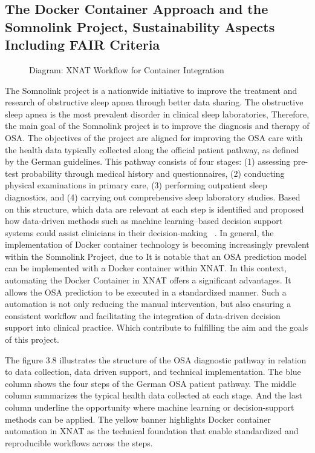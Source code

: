 \subsection{The Docker Container Approach and the Somnolink Project, Sustainability Aspects Including FAIR Criteria}
\begin{figure}[H]
    \centering
    \def\svgwidth{\linewidth} 
    
    \caption{Diagram: XNAT Workflow for Container Integration}
    \label{fig:workflowxnat}
\end{figure}

The Somnolink project is a nationwide initiative to improve the treatment and research of obstructive sleep apnea through better data sharing. The obstructive sleep apnea is the most prevalent disorder in clinical sleep laboratories, Therefore, the main goal of the Somnolink project is to improve the diagnosis and therapy of OSA.
The objectives of the project are aligned for improving the OSA care with the health data typically collected along the official patient pathway, as defined by the German guidelines. This pathway consists of four stages: (1) assessing pre-test probability through medical history and questionnaires, (2) conducting physical examinations in primary care, (3) performing outpatient sleep diagnostics, and (4) carrying out comprehensive sleep laboratory studies. Based on this structure, which data are relevant at each step is identified and proposed how data-driven methods such as machine learning–based decision support systems could assist clinicians in their decision-making ~\cite{krefting_somnolink_2025}.
In general, the implementation of Docker container technology is becoming increasingly prevalent within the Somnolink Project, due to It is notable that an OSA prediction model can be implemented with a Docker container within XNAT.
In this context, automating the Docker Container in XNAT offers a significant advantages. It allows the OSA prediction to be executed in a standardized manner. Such a automation is not only reducing the manual intervention, but also ensuring a consistent  workflow and facilitating  the integration of data-driven decision support into clinical practice. Which contribute to fulfilling the aim and the goals of this project.


The figure 3.8 illustrates the structure of the OSA diagnostic pathway in relation to data collection, data driven support, and technical implementation.
The blue column shows the four steps of the German OSA patient pathway. The middle column summarizes the typical health data collected at each stage. And the last column underline the opportunity where machine learning or decision-support methods can be applied. 
The yellow banner highlights Docker container automation in XNAT  as the technical foundation that enable standardized and reproducible workflows across the steps.

